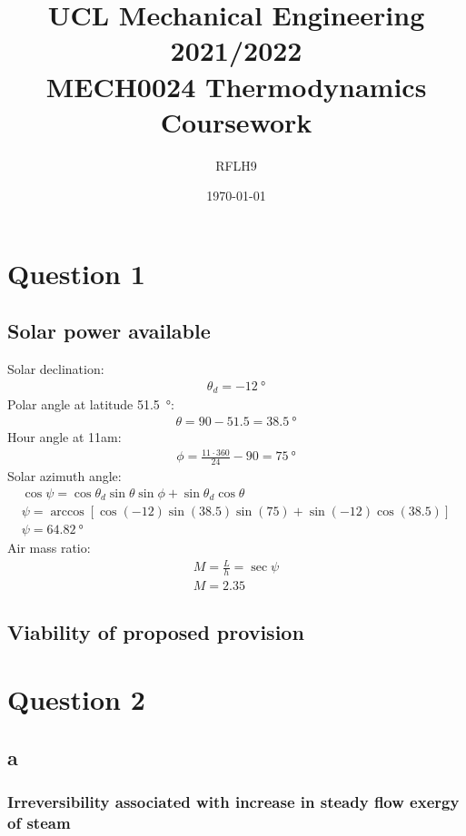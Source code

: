 \documentclass[11pt]{article}
\numberwithin{equation}{section}
\begin{document}
\title{\textbf{UCL Mechanical Engineering 2021/2022}\\MECH0024 Thermodynamics Coursework}
\author{RFLH9}
\date{\today}
\maketitle
\tableofcontents
\listoffigures
\listoftables
\newpage
\section{Question 1}
\subsection{Solar power available}
Solar declination:
\begin{gather}
    \theta_d = \SI{-12}{\degree}
\end{gather}
Polar angle at latitude \SI{51.5}{\degree}:
\begin{gather}
    \theta = 90 - 51.5 = \SI{38.5}{\degree}
\end{gather}
Hour angle at 11am:
\begin{gather}
    \phi = \frac{11\cdot 360}{24} -90 = \SI{75}{\degree}
\end{gather}
Solar azimuth angle:
\begin{gather}
    \cos \psi = \cos \theta_d \sin\theta \sin \phi + \sin\theta_d \cos \theta\\
    \psi = \arccos\left[\cos \left(-12\right)\sin\left(38.5\right)\sin\left(75\right) + \sin\left(-12\right)\cos\left(38.5\right)\right]\\
    \psi = \SI{64.82}{\degree}
\end{gather}
Air mass ratio:
\begin{gather}
    M = \frac{L}{h} = \sec\psi\\
    M = 2.35
\end{gather}
\subsection{Viability of proposed provision}
\section{Question 2}
\subsection{a}
\subsubsection{Irreversibility associated with increase in steady flow exergy of steam}
\end{document}
